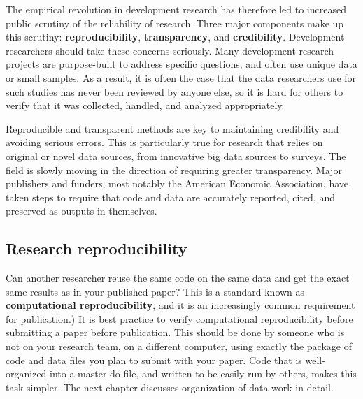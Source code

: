 The empirical revolution in development research\cite{angrist2017economic}
has therefore led to increased public scrutiny of the reliability of research.\cite{rogers_2017}
Three major components make up this scrutiny: \textbf{reproducibility}\cite{duvendack2017meant}, \textbf{transparency},\cite{christensen2018transparency} and \textbf{credibility}.\cite{ioannidis2017power}
Development researchers should take these concerns seriously.
Many development research projects are purpose-built to address specific questions,
and often use unique data or small samples.
As a result, it is often the case that the data 
researchers use for such studies has never been reviewed by anyone else,
so it is hard for others to verify that it was 
collected, handled, and analyzed appropriately.

Reproducible and transparent methods are key to maintaining credibility 
and avoiding serious errors. 
This is particularly true for research that relies on original or novel data sources, 
from innovative big data sources to surveys. 
The field is slowly moving in the direction of requiring greater transparency. 
Major publishers and funders, most notably the American Economic Association,
have taken steps to require that code and data
are accurately reported, cited, and preserved as outputs in themselves.


\subsection{Research reproducibility}

Can another researcher reuse the same code on the same data 
and get the exact same results as in your published paper?
This is a standard known as \textbf{computational reproducibility}, 
and it is an increasingly common requirement for publication.)
It is best practice to verify computational reproducibility before submitting a paper before publication. 
This should be done by someone who is not on your research team, on a different computer, 
using exactly the package of code and data files you plan to submit with your paper. 
Code that is well-organized into a master do-file, and written to be easily run by others, 
makes this task simpler. 
The next chapter discusses organization of data work in detail. 

